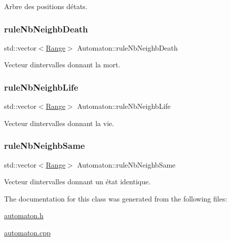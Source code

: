 Arbre des positions d\textquotesingle{}états. 

\mbox{\label{class_automaton_a3c4b049f935fe17aa3fc7e40c7fa8f7f}} 
\subsubsection{\texorpdfstring{rule\+Nb\+Neighb\+Death}{ruleNbNeighbDeath}}
{\footnotesize\ttfamily std\+::vector$<$\mbox{\hyperlink{struct_automaton_1_1_range}{Range}}$>$ Automaton\+::rule\+Nb\+Neighb\+Death}



Vecteur d\textquotesingle{}intervalles donnant la mort. 

\mbox{\label{class_automaton_afab3dec429a12d5c1e30c1691ec36c8c}} 
\subsubsection{\texorpdfstring{rule\+Nb\+Neighb\+Life}{ruleNbNeighbLife}}
{\footnotesize\ttfamily std\+::vector$<$\mbox{\hyperlink{struct_automaton_1_1_range}{Range}}$>$ Automaton\+::rule\+Nb\+Neighb\+Life}



Vecteur d\textquotesingle{}intervalles donnant la vie. 

\mbox{\label{class_automaton_a7a9a78c542bfdc9cb9c01ad268ae1485}} 
\subsubsection{\texorpdfstring{rule\+Nb\+Neighb\+Same}{ruleNbNeighbSame}}
{\footnotesize\ttfamily std\+::vector$<$\mbox{\hyperlink{struct_automaton_1_1_range}{Range}}$>$ Automaton\+::rule\+Nb\+Neighb\+Same}



Vecteur d\textquotesingle{}intervalles donnant un état identique. 



The documentation for this class was generated from the following files\+:\begin{DoxyCompactItemize}
\item 
\mbox{\hyperlink{automaton_8h}{automaton.\+h}}\item 
\mbox{\hyperlink{automaton_8cpp}{automaton.\+cpp}}\end{DoxyCompactItemize}
